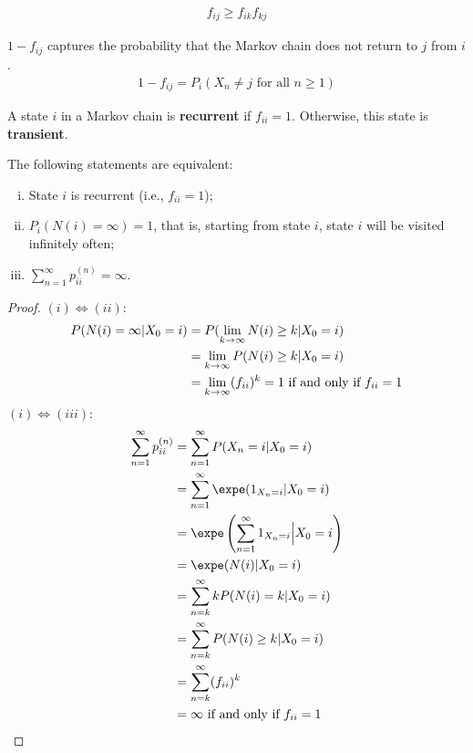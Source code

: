 \documentclass{article}
\begin{document}
	\begin{corollary}
		\begin{align}
			f_{ij} \geq f_{ik}f_{kj}
		\end{align}
	\end{corollary}
    
    \begin{proposition}
    	$1-f_{i j}$ captures the probability that the Markov chain does not return to $j$ from $i$.
    	\begin{align}
    		1-f_{i j}=P_{i}\left(X_{n} \neq j \text { for all } n \geq 1\right)
    	\end{align}
    \end{proposition}
    
    \begin{definition}
    	A state $i$ in a Markov chain is \textbf{recurrent} if $f_{ii} = 1$. Otherwise, this state is \textbf{transient}.
    \end{definition}
    
    \begin{theorem}
    	The following statements are equivalent:
    	\begin{enumerate}[(i)]
    		\item State $i$ is recurrent (i.e., $f_{ii}=1$);
    		\item $P_i(N(i) = \infty) = 1$, that is, starting from state $i$, state $i$ will be visited infinitely often;
    		\item $\sum_{n=1}^\infty p_{ii}^{(n)} = \infty$.
    	\end{enumerate}
    \end{theorem}

    \begin{proof}
    	$(i) \iff (ii)$:
    	\begin{align}
    		P(N(i) = \infty|X_0=i) &= P(\lim_{k \to \infty} N(i) \geq k| X_0=i) \\
    		&= \lim_{k \to \infty} P(N(i) \geq k| X_0=i) \\
    		&= \lim_{k \to \infty} (f_{ii})^k = 1 \text{{ if and only if }} f_{ii} = 1
    	\end{align}
    	$(i) \iff (iii)$:
    	\begin{align}
    		\sum_{n=1}^\infty p_{ii}^{(n)}
    		&= \sum_{n=1}^\infty P(X_n = i | X_0 = i) \\
    		&= \sum_{n=1}^\infty \expe (1_{X_n=i} | X_0 = i) \\
    		&= \expe \left(
    		\sum_{n=1}^\infty 1_{X_n=i} \Big| X_0 = i
    		\right ) \\
    		&= \expe (N(i) | X_0=i) \\
    		&= \sum_{n=k}^\infty k P(N(i)=k | X_0=i) \\
    		&= \sum_{n=k}^\infty P(N(i) \geq k | X_0=i) \\
    		&= \sum_{n=k}^\infty (f_{ii})^k \\
    		&= \infty \tx{ if and only if } f_{ii} = 1
    	\end{align}
    \end{proof}
 
\end{document}
